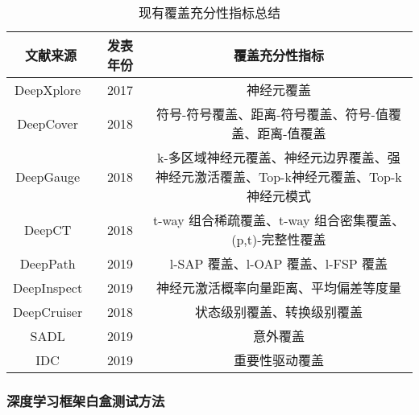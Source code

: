 \begin{table}[t]
	\small
	\centering
	\caption{现有覆盖充分性指标总结}
	\label{tab:coverage_criteria}
	\begin{tabular}{c|c|c}
		\toprule
		文献来源 & 发表年份 & 覆盖充分性指标 \\
		\midrule
		DeepXplore~\citess{Pei2019DeepXplore} & 2017 & 神经元覆盖 \\
		\midrule
	    DeepCover~\citess{Sun2018Testing} & 2018 & 符号-符号覆盖、距离-符号覆盖、符号-值覆盖、距离-值覆盖 \\
		\midrule
		DeepGauge~\citess{ma2018deepgauge} & 2018 & k-多区域神经元覆盖、神经元边界覆盖、强神经元激活覆盖、Top-k神经元覆盖、Top-k 神经元模式 \\
		\midrule
	    DeepCT~\citess{ma2019deepct} & 2018 & t-way 组合稀疏覆盖、t-way 组合密集覆盖、(p,t)-完整性覆盖 \\
	    \midrule
	    DeepPath~\citess{Wang2019DeepPath} & 2019 & l-SAP 覆盖、l-OAP 覆盖、l-FSP 覆盖 \\
	    \midrule
	    DeepInspect~\citess{Tian2019Testing} & 2019 & 神经元激活概率向量距离、平均偏差等度量 \\
	    \midrule
	    DeepCruiser~\citess{Du2018DeepCruiser} & 2018 & 状态级别覆盖、转换级别覆盖 \\
	    \midrule
	    SADL~\citess{Kim2019Guiding} & 2019 & 意外覆盖 \\
	    \midrule
	    IDC~\citess{Gerasimou2020Importance} & 2019 & 重要性驱动覆盖 \\
		\bottomrule
	\end{tabular}
\end{table}



\subsubsection{深度学习框架白盒测试方法}

